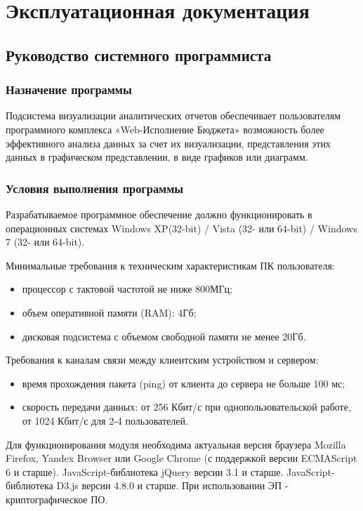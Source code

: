 \documentclass[a4paper]{extarticle}
\begin{document}
\section{Эксплуатационная документация}

\subsection{Руководство системного программиста}

\subsubsection{Назначение программы}
Подсистема визуализации аналитических отчетов обеспечивает пользователям программного комплекса «Web-Исполнение Бюджета» возможность более эффективного анализа данных за счет их визуализации, представления этих данных в графическом представлении, в виде графиков или диаграмм.

\subsubsection{Условия выполнения программы}
Разрабатываемое программное обеспечение должно функционировать в операционных системах Windows XP(32-bit) / Vista (32- или 64-bit) / Windows 7 (32- или 64-bit).\par
Минимальные требования к техническим характеристикам ПК пользователя:\par
\begin{itemize}
  \item процессор с тактовой частотой не ниже 800МГц;
  \item объем оперативной памяти (RAM): 4Гб;
  \item дисковая подсистема с объемом свободной памяти не менее 20Гб.
\end{itemize}\par
Требования к каналам связи между клиентским устройством и сервером:\par
\begin{itemize}
  \item время прохождения пакета (ping) от клиента до сервера не больше 100 мс;
  \item скорость передачи данных: от 256 Кбит/с при однопользовательской работе, от 1024 Кбит/с для 2-4 пользователей.
\end{itemize}\par
Для функционирования модуля необходима актуальная версия браузера Mozilla Firefox, Yandex Browser или Google Chrome (с поддержкой версии ECMAScript 6 и старше). JavaScript-библиотека jQuery версии 3.1 и старше. JavaScript-библиотека D3.js версии 4.8.0 и старше. При использовании ЭП - криптографическое ПО.
\end{document}
